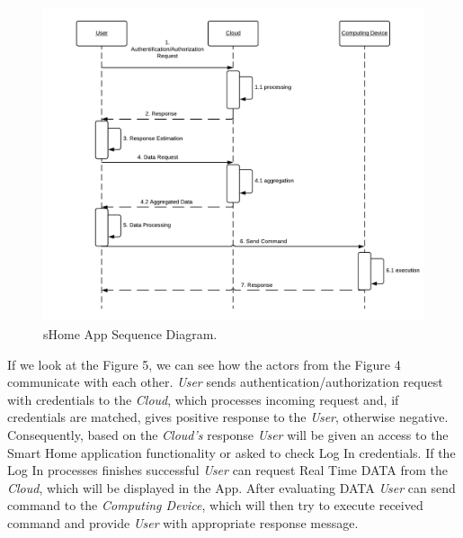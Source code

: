 \documentclass[12pt]{article}
\begin{document}
\begin{figure} [H] %
	\begin{center}
		\includegraphics[width=1\textwidth]{App_SD}
		\caption{sHome App Sequence Diagram.}
		\label{fig:ref_model}
	\end{center}
\end{figure}

If we look at the Figure 5, we can see how the actors from the Figure 4 communicate with each other. \textit{User} sends authentication/authorization request with credentials to the \textit{Cloud}, which processes incoming request and, if credentials are matched, gives positive response to the \textit{User}, otherwise negative. Consequently, based on the \textit{Cloud's} response \textit{User} will be given an access to the Smart Home application functionality or asked to check Log In credentials. If the Log In processes finishes successful \textit{User} can request Real Time DATA from the \textit{Cloud}, which will be displayed in the App. After evaluating DATA \textit{User} can send command to the \textit{Computing Device}, which will then try to execute received command and provide \textit{User} with appropriate response message.     
 
\end{document}
